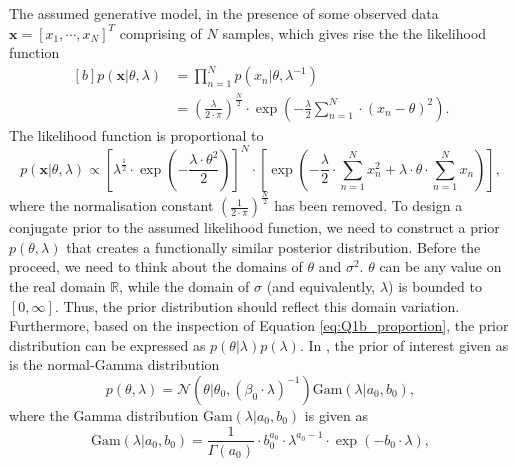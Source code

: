 \documentclass{article}
\begin{document}
The assumed generative model, in the presence of some observed data $\mathbf{x} = \left[x_1, \cdots, x_N \right]^T$ comprising of $N$ samples, which gives rise the the likelihood function
\begin{equation}
\begin{aligned}[b]
p(\mathbf{x} \vert \theta, \lambda) &= \prod_{n=1}^{N} p(x_n \vert \theta, \lambda^{-1}) \\
&= \left(\frac{\lambda}{2 \cdot \pi}\right)^{\frac{N}{2}} \cdot \exp \left( -\frac{\lambda}{2} \sum_{n=1}^{N} \cdot \left( x_n - \theta \right)^2 \right).
\end{aligned}
\end{equation}
The likelihood function is proportional to
\begin{equation}\label{eq:Q1b_proportion}
p(\mathbf{x} \vert \theta, \lambda) \propto \left[ \lambda^{\frac{1}{2}} \cdot \exp \left( -\frac{\lambda \cdot \theta^2}{2} \right)\right]^{N} \cdot \left[ \exp \left( - \frac{\lambda}{2} \cdot \sum_{n=1}^{N} x_n^2 + \lambda \cdot \theta \cdot \sum_{n=1}^{N}x_n \right) \right],
\end{equation}
where the normalisation constant $\left(\frac{1}{2 \cdot \pi}\right)^{\frac{N}{2}}$ has been removed. To design a conjugate prior to the assumed likelihood function, we need to construct a prior $p(\theta, \lambda)$ that creates a functionally similar posterior distribution. Before the proceed, we need to think about the domains of $\theta$ and $\sigma^2$. $\theta$ can be any value on the real domain $\mathbb{R}$, while the domain of $\sigma$ (and equivalently, $\lambda$) is bounded to $[0, \infty]$. Thus, the prior distribution should reflect this domain variation. Furthermore, based on the inspection of Equation \eqref{eq:Q1b_proportion}, the prior distribution can be expressed as $p(\theta \vert \lambda)p(\lambda)$. In \citeauthor*{bishop2006} \cite{bishop2006}, the prior of interest given as is the normal-Gamma distribution
\begin{equation}
p(\theta , \lambda) = \mathcal{N}\left( \theta \vert \theta_0, (\beta_0 \cdot \lambda)^{-1} \right)\text{Gam}\left( \lambda \vert a_0, b_0 \right),
\end{equation}
where the Gamma distribution $\text{Gam}\left( \lambda \vert a_0, b_0 \right)$ is given as
\begin{equation}
\text{Gam}\left( \lambda \vert a_0, b_0 \right) = \frac{1}{\Gamma(a_0)} \cdot b_{0}^{a_0} \cdot \lambda^{a_0 - 1} \cdot \exp \left( - b_0 \cdot \lambda \right),
\end{equation}
\end{document}
